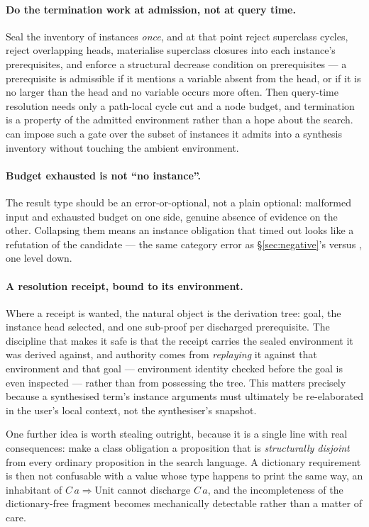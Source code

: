 \paragraph{Do the termination work at admission, not at query time.} Seal the
inventory of instances \emph{once}, and at that point reject superclass cycles,
reject overlapping heads, materialise superclass closures into each instance's
prerequisites, and enforce a structural decrease condition on prerequisites ---
a prerequisite is admissible if it mentions a variable absent from the head, or
if it is no larger than the head and no variable occurs more often. Then
query-time resolution needs only a path-local cycle cut and a node budget, and
termination is a property of the admitted environment rather than a hope about
the search. \forge{} can impose such a gate over the subset of instances it
admits into a synthesis inventory without touching the ambient environment.

\paragraph{Budget exhausted is not ``no instance''.} The result type should be
an error-or-optional, not a plain optional: malformed input and exhausted
budget on one side, genuine absence of evidence on the other. Collapsing them
means an instance obligation that timed out looks like a refutation of the
candidate --- the same category error as \S\ref{sec:negative}'s
 versus , one level down.

\paragraph{A resolution receipt, bound to its environment.} Where a receipt is
wanted, the natural object is the derivation tree: goal, the instance head
selected, and one sub-proof per discharged prerequisite. The discipline that
makes it safe is that the receipt carries the sealed environment it was derived
against, and authority comes from \emph{replaying} it against that environment
and that goal --- environment identity checked before the goal is even
inspected --- rather than from possessing the tree. This matters precisely
because a synthesised term's instance arguments must ultimately be re-elaborated
in the user's local context, not the synthesiser's snapshot.

One further idea is worth stealing outright, because it is a single line with
real consequences: make a class obligation a proposition that is
\emph{structurally disjoint} from every ordinary proposition in the search
language. A dictionary requirement is then not confusable with a value whose
type happens to print the same way, an inhabitant of $C\,a \Rightarrow \mathrm{Unit}$
cannot discharge $C\,a$, and the incompleteness of the dictionary-free fragment
becomes mechanically detectable rather than a matter of care.

